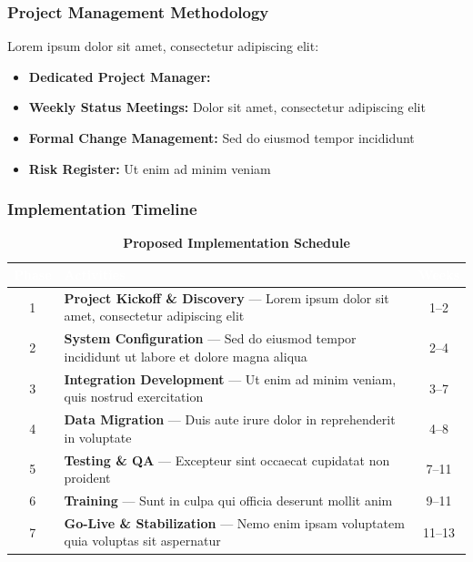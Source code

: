\subsubsection{Project Management Methodology}

Lorem ipsum dolor sit amet, consectetur adipiscing elit:

\begin{itemize}
    \item \textbf{Dedicated Project Manager:} 
    \item \textbf{Weekly Status Meetings:} Dolor sit amet, consectetur adipiscing elit
    \item \textbf{Formal Change Management:} Sed do eiusmod tempor incididunt
    \item \textbf{Risk Register:} Ut enim ad minim veniam
\end{itemize}

\subsubsection{Implementation Timeline}

\begin{table}[H]
\centering
\begin{tabularx}{\textwidth}{|c|X|c|}
\hline
\rowcolor{tableHeader}
\textcolor{white}{\textbf{Phase}} &
\textcolor{white}{\textbf{Activities}} &
\textcolor{white}{\textbf{Weeks}} \\
\hline
1 & \textbf{Project Kickoff \& Discovery} --- Lorem ipsum dolor sit amet, consectetur adipiscing elit & 1--2 \\ \hline
2 & \textbf{System Configuration} --- Sed do eiusmod tempor incididunt ut labore et dolore magna aliqua & 2--4 \\ \hline
3 & \textbf{Integration Development} --- Ut enim ad minim veniam, quis nostrud exercitation & 3--7 \\ \hline
4 & \textbf{Data Migration} --- Duis aute irure dolor in reprehenderit in voluptate & 4--8 \\ \hline
5 & \textbf{Testing \& QA} --- Excepteur sint occaecat cupidatat non proident & 7--11 \\ \hline
6 & \textbf{Training} --- Sunt in culpa qui officia deserunt mollit anim & 9--11 \\ \hline
7 & \textbf{Go-Live \& Stabilization} --- Nemo enim ipsam voluptatem quia voluptas sit aspernatur & 11--13 \\ \hline
\end{tabularx}
\caption{\textbf{Proposed Implementation Schedule}}
\end{table}

